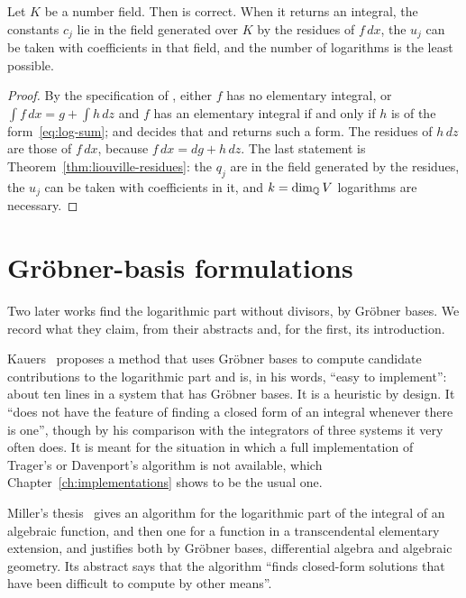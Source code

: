 \begin{theorem}\label{thm:integrate-algebraic}
Let $K$ be a number field. Then  is correct. When
it returns an integral, the
constants $c_j$ lie in the field generated over $K$ by the residues of
$f\,dx$, the $u_j$ can be taken with coefficients in that field, and the
number of logarithms is the least possible.
\end{theorem}

\begin{proof}
By the specification of , either $f$ has no elementary
integral, or $\int f\,dx = g + \int h\,dz$ and $f$ has an elementary integral
if and only if $h$ is of the form~\eqref{eq:log-sum}; and
 decides that and returns such a form. The residues
of $h\,dz$ are those of $f\,dx$, because $f\,dx = dg + h\,dz$. The last
statement is Theorem~\ref{thm:liouville-residues}: the $q_j$ are in the field
generated by the residues, the $u_j$ can be taken with coefficients in it,
and $k = \dim_{\mathbb{Q}} V$ logarithms are necessary.
\end{proof}

\section{Gr\"obner-basis formulations\later}\label{sec:log-groebner}

Two later works find the logarithmic part without divisors, by Gr\"obner
bases. We record what they claim, from their abstracts and, for the first,
its introduction.

Kauers~\cite{kauers2008} proposes a method that uses Gr\"obner bases to
compute candidate contributions to the logarithmic part and is, in his
words, ``easy to implement'': about ten lines in a system that has Gr\"obner
bases. It is a heuristic by design. It ``does not have the feature of
finding a closed form of an integral whenever there is one'', though by his
comparison with the integrators of three systems it very often does. It is
meant for the situation in which a full implementation of Trager's or
Davenport's algorithm is not available, which
Chapter~\ref{ch:implementations} shows to be the usual one.

Miller's thesis~\cite{miller2012} gives an algorithm for the logarithmic
part of the integral of an algebraic function, and then one for a function
in a transcendental elementary extension, and justifies both by Gr\"obner
bases, differential algebra and algebraic geometry. Its abstract says that
the algorithm ``finds closed-form solutions that have been difficult to
compute by other means''.


